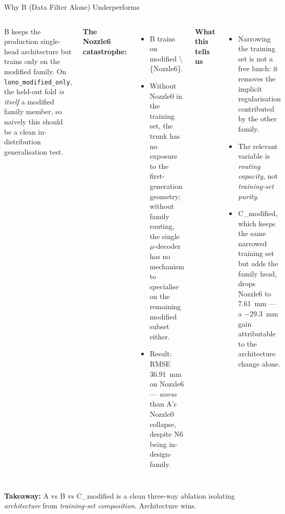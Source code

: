 \documentclass[UTF8,aspectratio=169]{ctexbeamer}
\begin{document}
\begin{frame}{Why B (Data Filter Alone) Underperforms}
\small
\begin{columns}[T]
B keeps the production single-head architecture but trains only on the modified
family. On \texttt{lono\_modified\_only}, the held-out fold \emph{is itself} a
modified family member, so naively this should be a clean in-distribution
generalisation test.

\vspace{0.4em}
\textbf{The Nozzle6 catastrophe:}
\begin{itemize}\setlength\itemsep{2pt}
  \item B trains on modified $\setminus$ \{Nozzle6\}.
  \item Without Nozzle0 in the training set, the trunk has no exposure to the
        first-generation geometry; without family routing, the single $\mu$-decoder
        has no mechanism to specialise on the remaining modified subset either.
  \item Result: RMSE 36.91~mm on Nozzle6 — \emph{worse} than A's Nozzle0 collapse,
        despite N6 being in-design-family.
\end{itemize}

\textbf{What this tells us}
\begin{itemize}\setlength\itemsep{3pt}
  \item Narrowing the training set is not a free lunch: it removes the implicit
        regularisation contributed by the other family.
  \item The relevant variable is \emph{routing capacity}, not
        \emph{training-set purity}.
  \item C\_modified, which keeps the same narrowed training set but adds the
        family head, drops Nozzle6 to 7.61~mm — a $-29.3$~mm gain attributable to
        the architecture change alone.
\end{itemize}
\end{columns}

\vspace{0.4em}
\footnotesize
\textbf{Takeaway:} A vs B vs C\_modified is a clean three-way ablation isolating
\emph{architecture} from \emph{training-set composition}. Architecture wins.
\end{frame}
\end{document}
